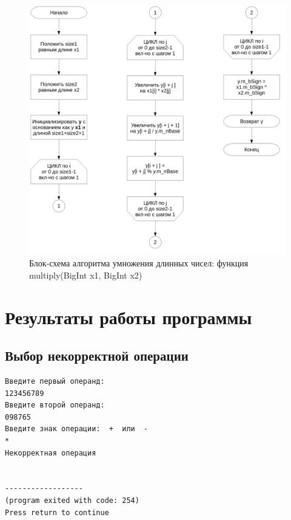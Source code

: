 \documentclass[a4paper,12pt]{article} %
\begin{document}
\begin{figure}[ht]
	\includegraphics[width=\textwidth]{lr2_multiply.pdf}
	\caption{Блок-схема алгоритма умножения длинных чисел: функция multiply(BigInt x1, BigInt x2)}
\end{figure}


\clearpage

\section*{Результаты работы программы}

\subsection*{Выбор некорректной операции}
\begin{verbatim}
Введите первый операнд:
123456789
Введите второй операнд:
098765
Введите знак операции:  +  или  -
*
Некорректная операция


------------------
(program exited with code: 254)
Press return to continue
\end{verbatim}
\end{document}
